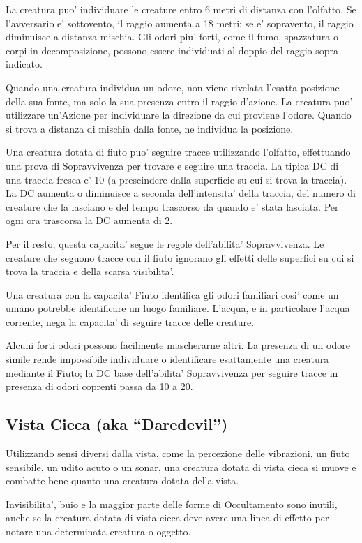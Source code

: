 \documentclass[a4paper,11pt,twoside,openany]{dndbook}
\begin{document}
La creatura puo' individuare le creature entro 6 metri di distanza con l'olfatto. Se l'avversario e' sottovento, il raggio aumenta a 18 metri; se e' sopravento, il raggio diminuisce a distanza mischia.
Gli odori piu' forti, come il fumo, spazzatura o corpi in decomposizione, possono essere individuati al doppio del raggio sopra indicato.

Quando una creatura individua un odore, non viene rivelata l'esatta posizione della sua fonte, ma solo la sua presenza entro il raggio d'azione. La creatura puo' utilizzare un'Azione per individuare la direzione da cui proviene l'odore. Quando si trova a distanza di mischia dalla fonte, ne individua la posizione.

Una creatura dotata di fiuto puo' seguire tracce utilizzando l'olfatto, effettuando una prova di Sopravvivenza per trovare e seguire una traccia. La tipica DC di una traccia fresca e' 10 (a prescindere dalla superficie su cui si trova la traccia). La DC aumenta o diminuisce a seconda dell'intensita' della traccia, del numero di creature che la lasciano e del tempo trascorso da quando e' stata lasciata. Per ogni ora trascorsa la DC aumenta di 2.

Per il resto, questa capacita' segue le regole dell'abilita' Sopravvivenza. Le creature che seguono tracce con il fiuto ignorano gli effetti delle superfici su cui si trova la traccia e della scarsa visibilita'.

Una creatura con la capacita' Fiuto identifica gli odori familiari cosi' come un umano potrebbe identificare un luogo familiare. L'acqua, e in particolare l'acqua corrente, nega la capacita' di seguire tracce delle creature.

Alcuni forti odori possono facilmente mascherarne altri. La presenza di un odore simile rende impossibile individuare o identificare esattamente una creatura mediante il Fiuto; la DC base dell'abilita' Sopravvivenza per seguire tracce in presenza di odori coprenti passa da 10 a 20.


\subsection{Vista Cieca (aka “Daredevil”)}

Utilizzando sensi diversi dalla vista, come la percezione delle vibrazioni, un fiuto sensibile, un udito acuto o un sonar, una creatura dotata di vista cieca si muove e combatte bene quanto una creatura dotata della vista. 

Invisibilita’, buio e la maggior parte delle forme di Occultamento sono inutili, anche se la creatura dotata di vista cieca deve avere una linea di effetto per notare una determinata creatura o oggetto. 
\end{document}
